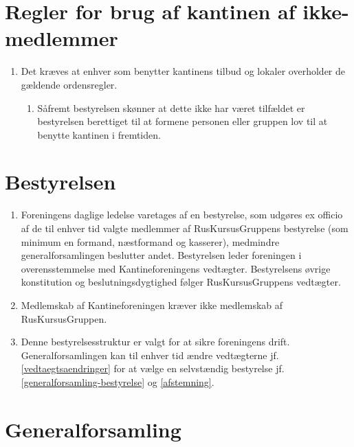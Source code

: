 \documentclass[a4paper, 10pt]{article}
\renewcommand\thesection{\textsection\arabic{section}}
\newenvironment{stykenum}{
  \begin{enumerate}[%
    label=Stk.~\arabic*., ref=\thesection~Stk.~\arabic*, start=1]
}{\end{enumerate}}
\newenvironment{substykenum}{
  \begin{enumerate}[%
          label=Stk.~\arabic{enumi}.\arabic*:,
      ref=\thesection~Stk.~\arabic{enumi}.\arabic*, start=1]
}{\end{enumerate}}
\begin{document}
\section{Regler for brug af kantinen af ikke-medlemmer}

\begin{stykenum}
\item Det kræves at enhver som benytter kantinens tilbud og lokaler
overholder de gældende ordensregler.
\begin{substykenum}
\item Såfremt bestyrelsen skønner at dette ikke har været tilfældet er
bestyrelsen berettiget til at formene personen eller gruppen lov til at benytte
kantinen i fremtiden.
\end{substykenum}
\end{stykenum}

\section{Bestyrelsen}

\begin{stykenum}

\item \label{bestyrelsen-ledelse} Foreningens daglige ledelse varetages af en
bestyrelse, som udgøres ex officio af de til enhver tid valgte medlemmer af
RusKursusGruppens bestyrelse (som minimum en formand, næstformand og kasserer),
medmindre generalforsamlingen beslutter andet. Bestyrelsen leder foreningen i
overensstemmelse med Kantineforeningens vedtægter. Bestyrelsens øvrige
konstitution og beslutningsdygtighed følger RusKursusGruppens vedtægter.

\item Medlemskab af Kantineforeningen kræver ikke medlemskab af
RusKursusGruppen.

\item Denne bestyrelsesstruktur er valgt for at sikre foreningens drift.
Generalforsamlingen kan til enhver tid ændre vedtægterne jf.
\ref*{vedtaegtsaendringer} for at vælge en selvstændig bestyrelse jf.
\ref*{generalforsamling-bestyrelse} og \ref*{afstemning}.

\end{stykenum}

\section{Generalforsamling}
\end{document}
